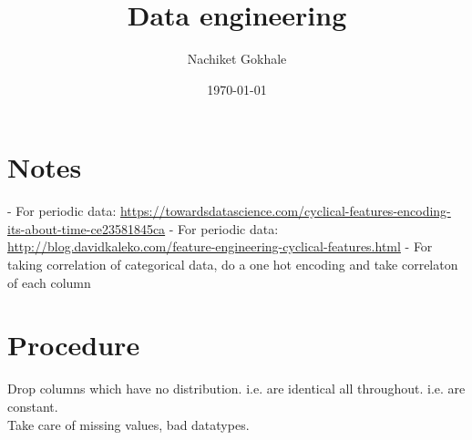 \documentclass{article}
\begin{document}
\title{Data engineering}
\author{Nachiket Gokhale}
\date{\today}
\maketitle
\section{Notes}
- For periodic data: \url{https://towardsdatascience.com/cyclical-features-encoding-its-about-time-ce23581845ca}
- For periodic data: \url{http://blog.davidkaleko.com/feature-engineering-cyclical-features.html}
- For taking correlation of categorical data, do a one hot encoding and take correlaton of each column

\section{Procedure}
Drop columns which have no distribution. i.e. are identical all throughout. i.e. are constant.\\
Take care of missing values, bad datatypes.
\end{document}
